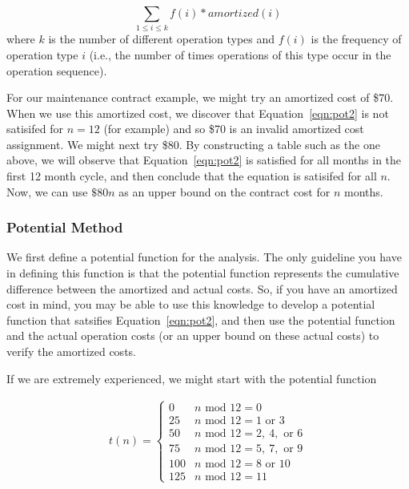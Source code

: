 $$\sum_{1 \leq i \leq k} f(i) * amortized(i)$$
where $k$ is the number of different operation types
and $f(i)$ is the frequency of operation type
$i$ (i.e., the number of times operations of this type
occur in the operation sequence).

For our maintenance contract example, we might try an amortized
cost of \$70. When we use
this amortized cost, we discover that Equation~\ref{eqn:pot2} is not satisifed
for $n = 12$ (for example) and so
\$70 is an invalid
amortized cost assignment.  We might next try \$80.
By constructing a table such as the one above, we will observe that
Equation~\ref{eqn:pot2} is satisfied for all months in the first 12
month cycle, and then conclude that the equation is satisifed for all
$n$. Now, we can use $\$80n$
as an upper bound on the contract cost for
$n$ months.

\subsubsection*{Potential Method}
We first define a potential function for the analysis.
The only guideline you have in defining this function is that the
potential function
represents the cumulative difference between the amortized and actual costs.
So, if you have an amortized cost in mind, you may be able to use this
knowledge to develop a potential function that satsifies Equation~\ref{eqn:pot2},
and then use the potential function and the actual operation costs (or
an upper bound on these actual costs) to verify the amortized costs.

If we are extremely experienced, we might start with the potential
function

\begin{eqnarray*}
t(n)  =  \left \{
            \begin{array}{ll}
         0 & n \mbox{ mod } 12 = 0 \\
         25 & n \mbox{ mod } 12 = 1 \mbox{ or } 3 \\
         50 & n \mbox{ mod } 12 = 2, \ 4, \mbox{ or } 6 \\
         75 & n \mbox{ mod } 12 = 5, \ 7, \mbox{ or } 9 \\
         100 & n \mbox{ mod } 12 = 8 \mbox{ or } 10 \\
         125 & n \mbox{ mod } 12 = 11  
            \end{array}
         \right.
\end{eqnarray*}

